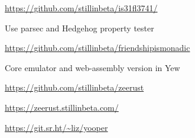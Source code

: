 \documentclass[letterpaper,11pt,notitlepage]{article}
\begin{document}
  \begin{employment}
  \item \url{https://github.com/stillinbeta/is31fl3741/}
  \end{employment}
    \begin{employment}
      \item Use parsec and Hedgehog property tester
      \item \url{https://github.com/stillinbeta/friendshipismonadic}
    \end{employment}
    \begin{employment}
      \item Core emulator and web-assembly version in Yew
      \item \url{https://github.com/stillinbeta/zeerust}
      \item \url{https://zeerust.stillinbeta.com/}
    \end{employment}
    \begin{employment}
      \item \url{https://git.sr.ht/~liz/yooper}
    \end{employment}
\end{document}
